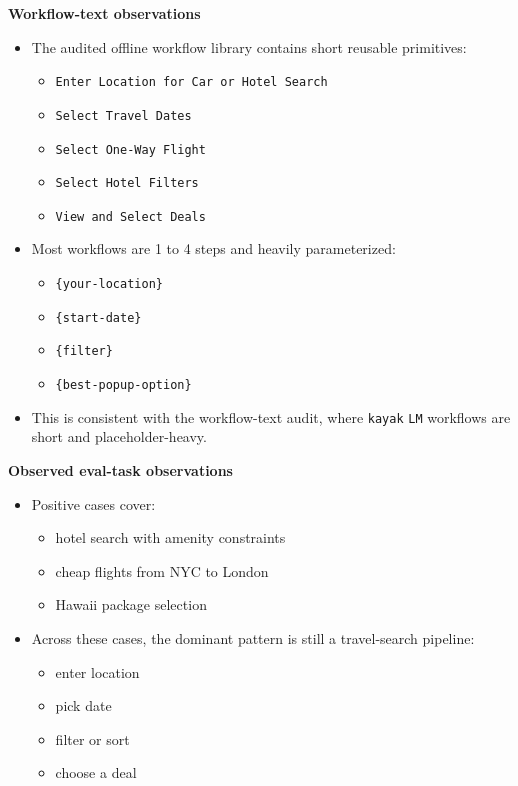 \textbf{Workflow-text observations}

\begin{itemize}
\tightlist
\item
  The audited offline workflow library contains short reusable
  primitives:

  \begin{itemize}
  \tightlist
  \item
    \texttt{Enter\ Location\ for\ Car\ or\ Hotel\ Search}
  \item
    \texttt{Select\ Travel\ Dates}
  \item
    \texttt{Select\ One-Way\ Flight}
  \item
    \texttt{Select\ Hotel\ Filters}
  \item
    \texttt{View\ and\ Select\ Deals}
  \end{itemize}
\item
  Most workflows are 1 to 4 steps and heavily parameterized:

  \begin{itemize}
  \tightlist
  \item
    \texttt{\{your-location\}}
  \item
    \texttt{\{start-date\}}
  \item
    \texttt{\{filter\}}
  \item
    \texttt{\{best-popup-option\}}
  \end{itemize}
\item
  This is consistent with the workflow-text audit, where \texttt{kayak}
  \texttt{LM} workflows are short and placeholder-heavy.
\end{itemize}

\textbf{Observed eval-task observations}

\begin{itemize}
\tightlist
\item
  Positive cases cover:

  \begin{itemize}
  \tightlist
  \item
    hotel search with amenity constraints
  \item
    cheap flights from NYC to London
  \item
    Hawaii package selection
  \end{itemize}
\item
  Across these cases, the dominant pattern is still a travel-search
  pipeline:

  \begin{itemize}
  \tightlist
  \item
    enter location
  \item
    pick date
  \item
    filter or sort
  \item
    choose a deal
  \end{itemize}
\end{itemize}

